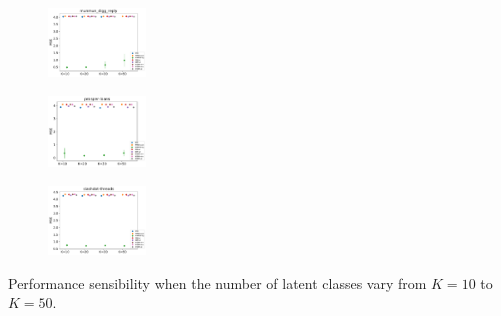 \begin{subfigure}
         \centering
      \includegraphics[width=0.23\textwidth]{fig2/digg-reply_wsim_evo2__}
\end{subfigure} 
\begin{subfigure}
         \centering
      \includegraphics[width=0.23\textwidth]{fig2/prosper-loans_wsim_evo2__}
\end{subfigure} 
\begin{subfigure}
         \centering
      \includegraphics[width=0.23\textwidth]{fig2/slashdot_wsim_evo2__}
\end{subfigure} 
\caption{Performance sensibility when the number of latent classes vary from $K=10$ to $K=50$.}

